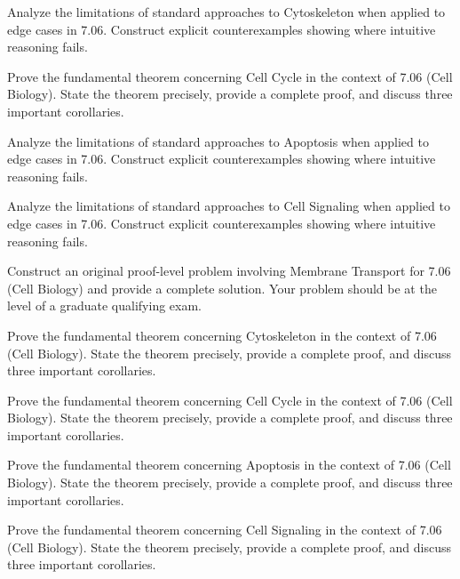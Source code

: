 \documentclass[12pt,a4paper]{exam}
\begin{document}
\begin{questions}
\vspace{0.3cm}

\question[5]
Analyze the limitations of standard approaches to Cytoskeleton when applied to edge cases in 7.06. Construct explicit counterexamples showing where intuitive reasoning fails.

\vspace{0.3cm}

\question[4]
Prove the fundamental theorem concerning Cell Cycle in the context of 7.06 (Cell Biology). State the theorem precisely, provide a complete proof, and discuss three important corollaries.

\vspace{0.3cm}

\question[4]
Analyze the limitations of standard approaches to Apoptosis when applied to edge cases in 7.06. Construct explicit counterexamples showing where intuitive reasoning fails.

\vspace{0.3cm}

\question[5]
Analyze the limitations of standard approaches to Cell Signaling when applied to edge cases in 7.06. Construct explicit counterexamples showing where intuitive reasoning fails.

\vspace{0.3cm}

\question[7]
Construct an original proof-level problem involving Membrane Transport for 7.06 (Cell Biology) and provide a complete solution. Your problem should be at the level of a graduate qualifying exam.

\vspace{0.3cm}

\question[3]
Prove the fundamental theorem concerning Cytoskeleton in the context of 7.06 (Cell Biology). State the theorem precisely, provide a complete proof, and discuss three important corollaries.

\vspace{0.3cm}

\question[2]
Prove the fundamental theorem concerning Cell Cycle in the context of 7.06 (Cell Biology). State the theorem precisely, provide a complete proof, and discuss three important corollaries.

\vspace{0.3cm}

\question[5]
Prove the fundamental theorem concerning Apoptosis in the context of 7.06 (Cell Biology). State the theorem precisely, provide a complete proof, and discuss three important corollaries.

\vspace{0.3cm}

\question[3]
Prove the fundamental theorem concerning Cell Signaling in the context of 7.06 (Cell Biology). State the theorem precisely, provide a complete proof, and discuss three important corollaries.

\vspace{0.3cm}

\end{questions}
\end{document}
